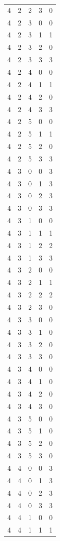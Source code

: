 \begin{longtable}{rrrrr}
4 & 2 & 2 & 3 & 0 \\
4 & 2 & 3 & 0 & 0 \\
4 & 2 & 3 & 1 & 1 \\
4 & 2 & 3 & 2 & 0 \\
4 & 2 & 3 & 3 & 3 \\
4 & 2 & 4 & 0 & 0 \\
4 & 2 & 4 & 1 & 1 \\
4 & 2 & 4 & 2 & 0 \\
4 & 2 & 4 & 3 & 3 \\
4 & 2 & 5 & 0 & 0 \\
4 & 2 & 5 & 1 & 1 \\
4 & 2 & 5 & 2 & 0 \\
4 & 2 & 5 & 3 & 3 \\
4 & 3 & 0 & 0 & 3 \\
4 & 3 & 0 & 1 & 3 \\
4 & 3 & 0 & 2 & 3 \\
4 & 3 & 0 & 3 & 3 \\
4 & 3 & 1 & 0 & 0 \\
4 & 3 & 1 & 1 & 1 \\
4 & 3 & 1 & 2 & 2 \\
4 & 3 & 1 & 3 & 3 \\
4 & 3 & 2 & 0 & 0 \\
4 & 3 & 2 & 1 & 1 \\
4 & 3 & 2 & 2 & 2 \\
4 & 3 & 2 & 3 & 0 \\
4 & 3 & 3 & 0 & 0 \\
4 & 3 & 3 & 1 & 0 \\
4 & 3 & 3 & 2 & 0 \\
4 & 3 & 3 & 3 & 0 \\
4 & 3 & 4 & 0 & 0 \\
4 & 3 & 4 & 1 & 0 \\
4 & 3 & 4 & 2 & 0 \\
4 & 3 & 4 & 3 & 0 \\
4 & 3 & 5 & 0 & 0 \\
4 & 3 & 5 & 1 & 0 \\
4 & 3 & 5 & 2 & 0 \\
4 & 3 & 5 & 3 & 0 \\
4 & 4 & 0 & 0 & 3 \\
4 & 4 & 0 & 1 & 3 \\
4 & 4 & 0 & 2 & 3 \\
4 & 4 & 0 & 3 & 3 \\
4 & 4 & 1 & 0 & 0 \\
4 & 4 & 1 & 1 & 1 \\

\end{longtable}
